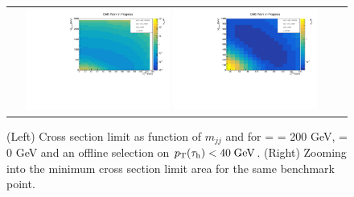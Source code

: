 \begin{figure}[tbh!]
	\centering
	\begin{tabular}{cc}
		\includegraphics[width=0.45\textwidth]{analysis/pics/JetInvMass_vs_MET_xsec_chi200_lsp000_taupt40.pdf}
		\includegraphics[width=0.45\textwidth]{analysis/pics/JetInvMass_vs_MET_xsec_chi200_lsp000_taupt40_zoom.pdf} 		
	\end{tabular}
	\caption{(Left) Cross section limit as function of $m_{jj}$ and \met for \charginopm = \neutralinotwo = 200 GeV, \neutralinoone = 0 GeV and an offline selection on $p_{\text{T}}(\tau_{\text{h}}) <  40\;\text{Ge}\kern-0.06667em\text{V}$. (Right) Zooming into the minimum cross section limit area for the same benchmark point.}
	\label{fig::JetInvMass_vs_MET_xsec_chi200_lsp000_taupt40}
\end{figure}

